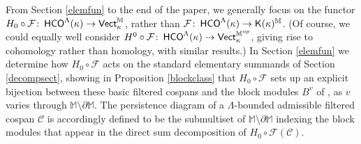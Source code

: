 \documentclass[11pt]{amsart}
\theoremstyle{definition}
\theoremstyle{remark}
\numberwithin{equation}{section}
\def\co{\colon\thinspace}
\begin{document}
From Section \ref{elemfun} to the end of the paper, we generally focus on the functor $H_0\circ \mathcal{F}\co \mathsf{HCO}^{\Lambda}(\kappa)\to \mathsf{Vect}_{\kappa}^{\mathbb{M}}$, rather than $\mathcal{F}\co \mathsf{HCO}^{\Lambda}(\kappa)\to\mathsf{K}(\kappa)^{\mathbb{M}}$.  (Of course, we could equally well consider $H^0\circ \mathcal{F}\co \mathsf{HCO}^{\Lambda}(\kappa)\to \mathsf{Vect}_{\kappa}^{\mathbb{M}^{op}}$, giving rise to cohomology rather than homology, with similar results.)  In Section \ref{elemfun} we determine how $H_0\circ\mathcal{F}$ acts on the standard elementary summands of Section \ref{decompsect}, showing in Proposition \ref{blockclass} that $H_0\circ\mathcal{F}$ sets up an explicit bijection between these basic filtered cospans and the block modules $B^v$ of \cite{BBF21}, as $v$ varies through $\mathbb{M}\setminus\partial\mathbb{M}$.  The persistence diagram of a $\Lambda$-bounded admissible filtered cospan $\mathcal{C}$ is accordingly defined to be the submultiset of $\mathbb{M}\setminus\partial\mathbb{M}$ indexing the block modules that appear in the direct sum decomposition of $H_0\circ\mathcal{F}(\mathcal{C})$.  
\end{document}
